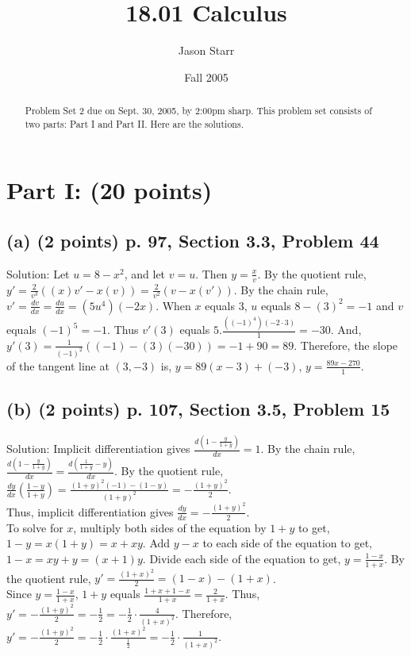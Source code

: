 \documentclass{article}
\title{18.01 Calculus}
\author[1]{Jason Starr}
\affil[1]{Massachusetts Institute of Technology}
\date{Fall 2005}
\begin{document}
\maketitle
\begin{abstract}
Problem Set 2 due on Sept. 30, 2005, by 2:00pm sharp. This problem set consists of two parts: Part I and Part II. Here are the solutions.
\end{abstract}
\section*{Part I: (20 points)}
\subsection*{(a) (2 points) p. 97, Section 3.3, Problem 44}
Solution: Let $u = 8 - x^{2}$, and let $v = u$. Then $y = \frac{x}{v}$. By the quotient rule, $y' = \frac{2}{v^{3}} ((x) v' - x(v)) = \frac{2}{v^{2}} (v - x(v'))$. By the chain rule, $v' = \frac{dv}{dx} = \frac{du}{dx} = (5u^{4})(-2x)$. When $x$ equals $3$, $u$ equals $8 - (3)^{2} = -1$ and $v$ equals $(-1)^{5} = -1$. Thus $v'(3)$ equals $5.\frac{((-1)^{4})(-2 \cdot 3)}{1} = -30$. And, $y'(3) = \frac{1}{(-1)^{2}} ((-1) - (3)(-30)) = -1 + 90 = 89$. Therefore, the slope of the tangent line at $(3, -3)$ is, $y = 89(x - 3) + (-3)$, $y = \frac{89x - 270}{1}$.

\subsection*{(b) (2 points) p. 107, Section 3.5, Problem 15}
Solution: Implicit differentiation gives $\frac{d \left(1 - \frac{y}{1 + y}\right)}{dx} = 1$. By the chain rule, $\frac{d \left(1 - \frac{y}{1 + y}\right)}{dx} = \frac{d \left(\frac{1}{1 + y} - y\right)}{dx}$. By the quotient rule, $\frac{dy}{dx} \left(\frac{1 - y}{1 + y}\right) = \frac{(1 + y)^{2}(-1) - (1 - y)}{(1 + y)^{2}} = -\frac{(1 + y)^{2}}{2}$.\\
Thus, implicit differentiation gives $\frac{dy}{dx} = -\frac{(1 + y)^{2}}{2}$.\\
To solve for $x$, multiply both sides of the equation by $1 + y$ to get, $1 - y = x(1 + y) = x + xy$. Add $y - x$ to each side of the equation to get, $1 - x = xy + y = (x + 1)y$. Divide each side of the equation to get, $y = \frac{1 - x}{1 + x}$. By the quotient rule, $y' = \frac{(1 + x)^{2}}{2} = (1 - x) - (1 + x)$.\\
Since $y = \frac{1 - x}{1 + x}$, $1 + y$ equals $\frac{1 + x + 1 - x}{1 + x} = \frac{2}{1 + x}$. Thus, $y' = -\frac{(1 + y)^{2}}{2} = -\frac{1}{2} = -\frac{1}{2} \cdot \frac{4}{(1 + x)^{2}}$. Therefore, $y' = -\frac{(1 + y)^{2}}{2} = -\frac{1}{2} \cdot \frac{(1 + x)^{2}}{\frac{1}{2}} = -\frac{1}{2} \cdot \frac{1}{(1 + x)^{2}}$.
\end{document}
